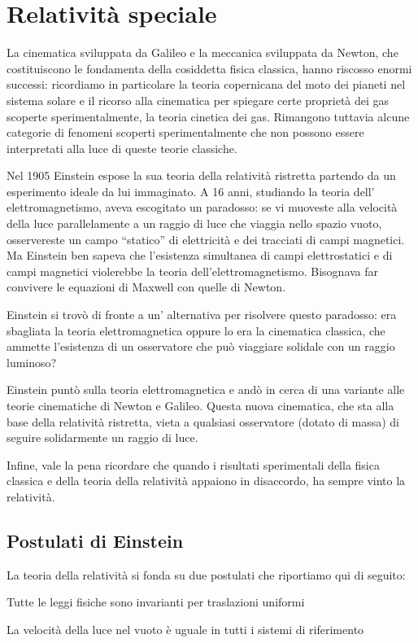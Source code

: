 \chapter{Relatività speciale}
\minitoc

La cinematica sviluppata da Galileo e la meccanica sviluppata da Newton, che costituiscono le fondamenta della cosiddetta 
fisica classica, hanno riscosso enormi successi: ricordiamo in particolare la teoria copernicana del moto dei pianeti 
nel sistema solare e il ricorso alla cinematica per spiegare certe proprietà dei gas scoperte sperimentalmente, la 
teoria cinetica dei gas.
Rimangono tuttavia alcune categorie di fenomeni scoperti sperimentalmente che non possono essere interpretati alla luce 
di queste teorie classiche.

Nel 1905 Einstein espose la sua teoria della relatività ristretta partendo da un esperimento ideale da lui immaginato. 
A 16 anni, studiando la teoria dell' elettromagnetismo, aveva escogitato un paradosso: se vi muoveste alla velocità della luce 
parallelamente a un raggio di luce che viaggia nello spazio vuoto, osservereste un campo ``statico'' di elettricità e dei 
tracciati di campi magnetici. Ma Einstein ben sapeva che l'esistenza simultanea di campi elettrostatici e di campi magnetici 
violerebbe la teoria dell'elettromagnetismo. 
Bisognava far convivere le equazioni di Maxwell con quelle di Newton.

Einstein si trovò di fronte a un' alternativa per risolvere questo paradosso: era sbagliata la teoria elettromagnetica
oppure lo era la cinematica classica, che ammette l'esistenza di un osservatore che può viaggiare solidale con un raggio luminoso? 

Einstein puntò sulla teoria elettromagnetica e andò in cerca di una variante alle teorie cinematiche di Newton e Galileo. 
Questa nuova cinematica, che sta alla base della relatività ristretta, vieta a qualsiasi osservatore (dotato di massa) 
di seguire solidarmente un raggio di luce.

Infine, vale la pena ricordare che quando i risultati sperimentali della fisica classica e della teoria della 
relatività appaiono in disaccordo, ha sempre vinto la relatività.

\section{Postulati di Einstein}
La teoria della relatività si fonda su due postulati che riportiamo qui di seguito:
\begin{post}
Tutte le leggi fisiche sono invarianti per traslazioni uniformi
\end{post}
\begin{post}
La velocità della luce nel vuoto è uguale in tutti i sistemi di riferimento
\end{post}

